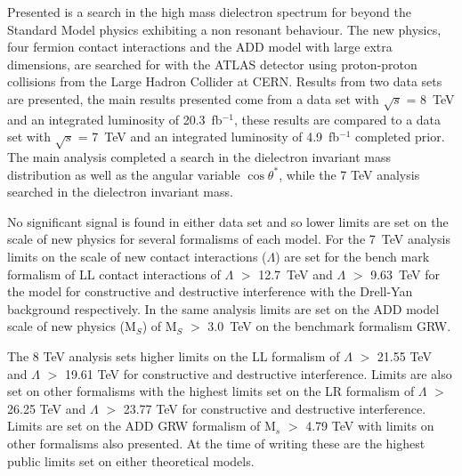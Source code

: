 Presented is a search in the high mass dielectron spectrum for beyond the Standard Model physics exhibiting a non resonant behaviour. The new physics, four fermion contact interactions and the ADD model with large extra dimensions, are searched for with the ATLAS detector using proton-proton collisions from the Large Hadron Collider at CERN. Results from two data sets are presented, the main results presented come from a data set with $\sqrt{s}$ = 8~TeV and an integrated luminosity of 20.3~fb$^{-1}$, these results are compared to a data set with $\sqrt{s}$ = 7~TeV and an integrated luminosity of 4.9~fb$^{-1}$ completed prior. The main analysis completed a search in the dielectron invariant mass distribution as well as the angular variable $\cos{\theta^{*}}$, while the 7 TeV analysis searched in the dielectron invariant mass. 

No significant signal is found in either data set and so lower limits are set on the scale of new physics for several formalisms of each model. 
For the 7~TeV analysis limits on the scale of new contact interactions ($\Lambda$) are set for the bench mark formalism of LL contact interactions of $\Lambda$ $>$ 12.7~TeV and $\Lambda$ $>$ 9.63~TeV for the model for constructive and destructive interference with the Drell-Yan background respectively. In the same analysis limits are set on the ADD model scale of new physics (M$_{S}$) of M$_{S}$ $>$ 3.0~TeV on the benchmark formalism GRW.

The 8 TeV analysis sets higher limits on the LL formalism of $\Lambda$ $>$ 21.55 TeV and $\Lambda$ $>$ 19.61 TeV for constructive and destructive interference. Limits are also set on other formalisms with the highest limits set on the LR formalism of $\Lambda$ $>$ 26.25 TeV and $\Lambda$ $>$ 23.77 TeV for constructive and destructive interference. Limits are set on the ADD GRW formalism of M$_{s}$ $>$ 4.79 TeV with limits on other formalisms also presented. At the time of writing these are the highest public limits set on either theoretical models.



